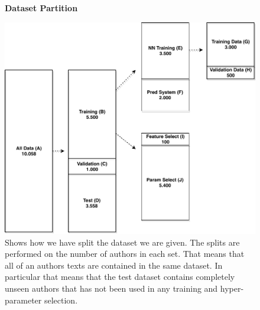 \begin{figure}
    \centering
    \textbf{Dataset Partition}\par\medskip
    \includegraphics[width=.6\textwidth]{./pictures/data/data_split}
    \caption{Shows how we have split the dataset we are given. The splits are
        performed on the number of authors in each set. That means that all of
        an authors texts are contained in the same dataset. In particular that
        means that the test dataset contains completely unseen authors that has
        not been used in any training and hyper-parameter selection.}
    \label{fig:data_split}
\end{figure}


